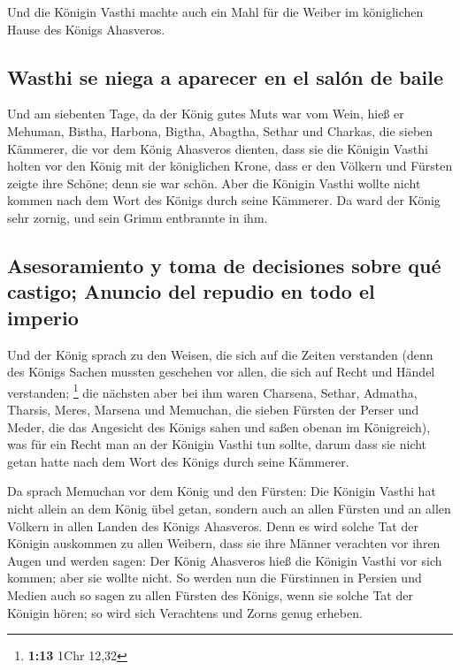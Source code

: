  Und die Königin Vasthi machte auch ein Mahl für die
Weiber im königlichen Hause des Königs Ahasveros.

\hypertarget{wasthi-se-niega-a-aparecer-en-el-saluxf3n-de-baile}{%
\subsection{Wasthi se niega a aparecer en el salón de
baile}\label{wasthi-se-niega-a-aparecer-en-el-saluxf3n-de-baile}}

 Und am siebenten Tage, da der König gutes Muts war vom
Wein, hieß er Mehuman, Bistha, Harbona, Bigtha, Abagtha, Sethar und
Charkas, die sieben Kämmerer, die vor dem König Ahasveros dienten,
 dass sie die Königin Vasthi holten vor den König mit der
königlichen Krone, dass er den Völkern und Fürsten zeigte ihre Schöne;
denn sie war schön.  Aber die Königin Vasthi wollte nicht
kommen nach dem Wort des Königs durch seine Kämmerer. Da ward der König
sehr zornig, und sein Grimm entbrannte in ihm.

\hypertarget{asesoramiento-y-toma-de-decisiones-sobre-quuxe9-castigo-anuncio-del-repudio-en-todo-el-imperio}{%
\subsection{Asesoramiento y toma de decisiones sobre qué castigo;
Anuncio del repudio en todo el
imperio}\label{asesoramiento-y-toma-de-decisiones-sobre-quuxe9-castigo-anuncio-del-repudio-en-todo-el-imperio}}

 Und der König sprach zu den Weisen, die sich auf die
Zeiten verstanden (denn des Königs Sachen mussten geschehen vor allen,
die sich auf Recht und Händel verstanden; \footnote{\textbf{1:13} 1Chr
  12,32}  die nächsten aber bei ihm waren Charsena,
Sethar, Admatha, Tharsis, Meres, Marsena und Memuchan, die sieben
Fürsten der Perser und Meder, die das Angesicht des Königs sahen und
saßen obenan im Königreich),  was für ein Recht man an
der Königin Vasthi tun sollte, darum dass sie nicht getan hatte nach dem
Wort des Königs durch seine Kämmerer.

 Da sprach Memuchan vor dem König und den Fürsten: Die
Königin Vasthi hat nicht allein an dem König übel getan, sondern auch an
allen Fürsten und an allen Völkern in allen Landen des Königs Ahasveros.
 Denn es wird solche Tat der Königin auskommen zu allen
Weibern, dass sie ihre Männer verachten vor ihren Augen und werden
sagen: Der König Ahasveros hieß die Königin Vasthi vor sich kommen; aber
sie wollte nicht.  So werden nun die Fürstinnen in
Persien und Medien auch so sagen zu allen Fürsten des Königs, wenn sie
solche Tat der Königin hören; so wird sich Verachtens und Zorns genug
erheben.

